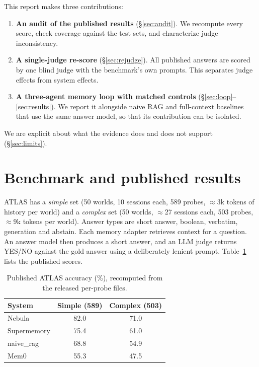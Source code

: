 \documentclass[11pt]{article}
\begin{document}
This report makes three contributions:
\begin{enumerate}
\item \textbf{An audit of the published results} (\S\ref{sec:audit}). We recompute every score, check coverage against the test sets, and characterize judge inconsistency.
\item \textbf{A single-judge re-score} (\S\ref{sec:rejudge}). All published answers are scored by one blind judge with the benchmark's own prompts. This separates judge effects from system effects.
\item \textbf{A three-agent memory loop with matched controls} (\S\ref{sec:loop}--\ref{sec:results}). We report it alongside naive RAG and full-context baselines that use the same answer model, so that its contribution can be isolated.
\end{enumerate}
We are explicit about what the evidence does and does not support (\S\ref{sec:limits}).

\section{Benchmark and published results}
ATLAS has a \emph{simple} set (50 worlds, 10 sessions each, 589 probes, ${\approx}$3k tokens of history per world) and a \emph{complex} set (50 worlds, ${\approx}$27 sessions each, 503 probes, ${\approx}$9k tokens per world). Answer types are short answer, boolean, verbatim, generation and abstain. Each memory adapter retrieves context for a question. An answer model then produces a short answer, and an LLM judge returns YES/NO against the gold answer using a deliberately lenient prompt. Table~\ref{tab:published} lists the published scores.

\begin{table}[h]
\centering\small
\begin{tabular}{lcc}
\toprule
System & Simple (589) & Complex (503)\\
\midrule
Nebula & 82.0 & 71.0\\
Supermemory & 75.4 & 61.0\\
naive\_rag & 68.8 & 54.9\\
Mem0 & 55.3 & 47.5\\
\bottomrule
\end{tabular}
\caption{Published ATLAS accuracy (\%), recomputed from the released per-probe files.}
\label{tab:published}
\end{table}
\end{document}
